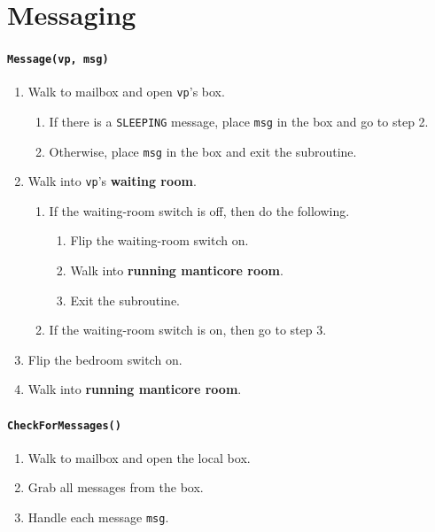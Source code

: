 \documentclass[11pt]{article}
\begin{document}
\section{Messaging}

\paragraph{\texttt{Message(vp, msg)}}
\begin{enumerate}
  \item Walk to mailbox and open \texttt{vp}'s box.
    \begin{enumerate}
      \item If there is a \texttt{SLEEPING} message, place \texttt{msg} in the box and go to step 2.
      \item Otherwise, place \texttt{msg} in the box and exit the subroutine.
    \end{enumerate}
  \item Walk into \texttt{vp}'s \textbf{waiting room}.
    \begin{enumerate}
      \item If the waiting-room switch is off, then do the following.
        \begin{enumerate}
          \item Flip the waiting-room switch on.
          \item Walk into \textbf{running manticore room}.
          \item Exit the subroutine.
        \end{enumerate}
      \item If the waiting-room switch is on, then go to step 3.
    \end{enumerate}
  \item Flip the bedroom switch on.
  \item Walk into \textbf{running manticore room}.
\end{enumerate}

\paragraph{\texttt{CheckForMessages()}}

\begin{enumerate}
  \item Walk to mailbox and open the local box.
  \item Grab all messages from the box.
  \item Handle each message \texttt{msg}.
\end{enumerate}
\end{document}

